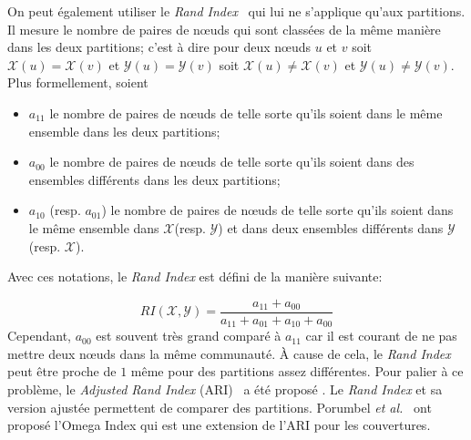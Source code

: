 On peut également utiliser le \emph{Rand Index}~\cite{Rand1971} qui lui ne s'applique qu'aux partitions.
Il mesure le nombre de paires de n\oe{}uds qui sont classées de la même manière dans les deux partitions; c'est à dire pour deux n\oe{}uds $u$ et $v$ soit $\mathcal{X}(u)=\mathcal{X}(v)$ et $\mathcal{Y}(u)=\mathcal{Y}(v)$ soit $\mathcal{X}(u)\neq \mathcal{X}(v)$ et $\mathcal{Y}(u)\neq \mathcal{Y}(v)$.
Plus formellement, soient
\begin{itemize}
\item $a_{11}$ le nombre de paires de n\oe{}uds de telle sorte qu'ils soient dans le même ensemble dans les deux partitions;
\item $a_{00}$ le nombre de paires de n\oe{}uds de telle sorte qu'ils soient dans des ensembles différents dans les deux partitions;
\item $a_{10}$ (resp. $a_{01}$) le nombre de paires de n\oe{}uds de telle sorte qu'ils soient dans le même ensemble dans $\mathcal{X}$(resp. $\mathcal{Y}$) et dans deux ensembles différents dans $\mathcal{Y}$ (resp. $\mathcal{X}$).
\end{itemize}
Avec ces notations, le \emph{Rand Index} est défini de la manière suivante:

\begin{equation}
RI(\mathcal{X},\mathcal{Y}) = \dfrac{a_{11} + a_{00}}{a_{11}+a_{01}+a_{10}+ a_{00}}
\end{equation}
Cependant, $a_{00}$ est souvent très grand comparé à $a_{11}$ car il est courant de ne pas mettre deux n\oe{}uds dans la même communauté.
\`A cause de cela, le \emph{Rand Index} peut être proche de $1$ même pour des partitions assez différentes.
Pour palier à ce problème, le \emph{Adjusted Rand Index} (ARI)~\cite{Hubert1985} a été proposé .
Le \emph{Rand Index} et sa version ajustée permettent de comparer des partitions.
Porumbel \emph{et al.}~\cite{Porumbel2011} ont proposé l'Omega Index qui est une extension de l'ARI pour les couvertures.

